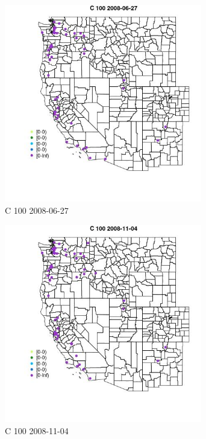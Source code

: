 \begin{figure} 
\centering  
\includegraphics[width=0.77\textwidth]{Code_Outputs/Report_ML_input_PM25_Step4_part_e_de_duplicated_aves_MapObsC_1002008-06-27.jpg} 
\caption{\label{fig:Report_ML_input_PM25_Step4_part_e_de_duplicated_avesMapObsC_1002008-06-27}C 100 2008-06-27} 
\end{figure} 
 

\begin{figure} 
\centering  
\includegraphics[width=0.77\textwidth]{Code_Outputs/Report_ML_input_PM25_Step4_part_e_de_duplicated_aves_MapObsC_1002008-11-04.jpg} 
\caption{\label{fig:Report_ML_input_PM25_Step4_part_e_de_duplicated_avesMapObsC_1002008-11-04}C 100 2008-11-04} 
\end{figure} 
 

